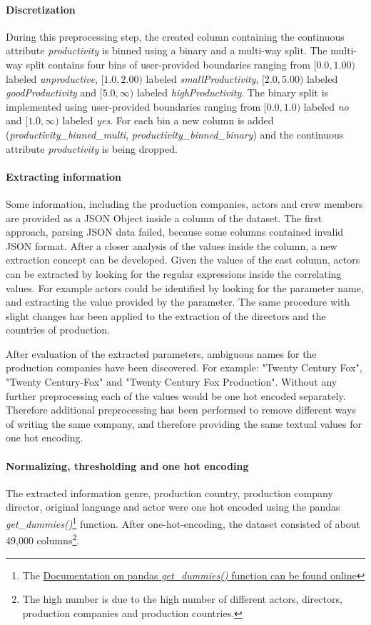 \paragraph{Discretization}
During this preprocessing step, the created column containing the continuous attribute \textit{productivity} is binned using a binary and a multi-way split. The multi-way split contains four bins of user-provided boundaries ranging from $[0.0, 1.00)$ labeled \textit{unproductive}, $[1.0, 2.00)$ labeled \textit{smallProductivity}, $[2.0, 5.00)$ labeled \textit{goodProductivity} and $[5.0, \infty)$ labeled \textit{highProductivity}. The binary split is implemented using user-provided boundaries ranging from $[0.0, 1.0)$ labeled \textit{no} and $[1.0, \infty)$ labeled \textit{yes}. For each bin a new column is added (\textit{productivity\_binned\_multi}, \textit{productivity\_binned\_binary}) and the continuous attribute \textit{productivity} is being dropped.

\paragraph{Extracting information}
Some information, including the production companies, actors and crew members are provided as a JSON Object inside a column of the dataset. The first approach, parsing  JSON data failed, because some columns contained invalid JSON format. After a closer analysis of the values inside the column, a new extraction concept can be developed. Given the values of the cast column, actors can be extracted by looking for the regular expressions inside the correlating values. For example actors could be identified by looking for the parameter name, and extracting the value provided by the parameter. The same procedure with slight changes has been applied to the extraction of the directors and the countries of production.

After evaluation of the extracted parameters, ambiguous names for the production companies have been discovered. For example: "Twenty Century Fox", "Twenty Century-Fox" and "Twenty Century Fox Production". Without any further preprocessing each of the values would be one hot encoded separately. Therefore additional preprocessing has been performed to remove different ways of writing the same company, and therefore providing the same textual values for one hot encoding.

\paragraph{Normalizing, thresholding and one hot encoding}
The extracted information genre, production country, production company director, original language  and actor were one hot encoded using the pandas \textit{get\_dummies()}\footnote{The \hyperref{https://pandas.pydata.org/pandas-docs/stable/generated/pandas.get_dummies.html}{documentation}{pd.getDumies}{Documentation on pandas \textit{get\_dummies()} function can be found online}} function. After one-hot-encoding, the dataset consisted of about 49,000 columns\footnote{The high number is due to the high number of different actors, directors, production companies and production countries.}.


